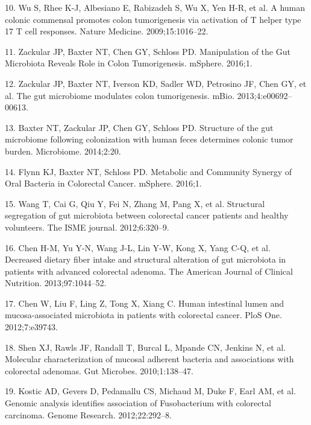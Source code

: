 \documentclass[12pt,]{article}
\begin{document}
\hypertarget{ref-wu_human_2009}{}
10. Wu S, Rhee K-J, Albesiano E, Rabizadeh S, Wu X, Yen H-R, et al. A
human colonic commensal promotes colon tumorigenesis via activation of T
helper type 17 T cell responses. Nature Medicine. 2009;15:1016--22.

\hypertarget{ref-zackular_manipulation_2016}{}
11. Zackular JP, Baxter NT, Chen GY, Schloss PD. Manipulation of the Gut
Microbiota Reveals Role in Colon Tumorigenesis. mSphere. 2016;1.

\hypertarget{ref-zackular_gut_2013}{}
12. Zackular JP, Baxter NT, Iverson KD, Sadler WD, Petrosino JF, Chen
GY, et al. The gut microbiome modulates colon tumorigenesis. mBio.
2013;4:e00692--00613.

\hypertarget{ref-baxter_structure_2014}{}
13. Baxter NT, Zackular JP, Chen GY, Schloss PD. Structure of the gut
microbiome following colonization with human feces determines colonic
tumor burden. Microbiome. 2014;2:20.

\hypertarget{ref-flynn_metabolic_2016}{}
14. Flynn KJ, Baxter NT, Schloss PD. Metabolic and Community Synergy of
Oral Bacteria in Colorectal Cancer. mSphere. 2016;1.

\hypertarget{ref-wang_structural_2012}{}
15. Wang T, Cai G, Qiu Y, Fei N, Zhang M, Pang X, et al. Structural
segregation of gut microbiota between colorectal cancer patients and
healthy volunteers. The ISME journal. 2012;6:320--9.

\hypertarget{ref-chen_decreased_2013}{}
16. Chen H-M, Yu Y-N, Wang J-L, Lin Y-W, Kong X, Yang C-Q, et al.
Decreased dietary fiber intake and structural alteration of gut
microbiota in patients with advanced colorectal adenoma. The American
Journal of Clinical Nutrition. 2013;97:1044--52.

\hypertarget{ref-chen_human_2012}{}
17. Chen W, Liu F, Ling Z, Tong X, Xiang C. Human intestinal lumen and
mucosa-associated microbiota in patients with colorectal cancer. PloS
One. 2012;7:e39743.

\hypertarget{ref-shen_molecular_2010}{}
18. Shen XJ, Rawls JF, Randall T, Burcal L, Mpande CN, Jenkins N, et al.
Molecular characterization of mucosal adherent bacteria and associations
with colorectal adenomas. Gut Microbes. 2010;1:138--47.

\hypertarget{ref-kostic_genomic_2012}{}
19. Kostic AD, Gevers D, Pedamallu CS, Michaud M, Duke F, Earl AM, et
al. Genomic analysis identifies association of Fusobacterium with
colorectal carcinoma. Genome Research. 2012;22:292--8.
\end{document}
